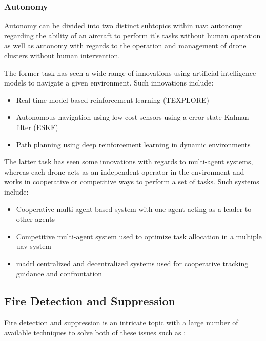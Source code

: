 \documentclass[runningheads]{llncs}
\begin{document}
\subsubsection{Autonomy}

Autonomy can be divided into two distinct subtopics within \acrshort{uav}: autonomy regarding the ability of an aircraft to perform it's tasks without human operation as well as autonomy with regards to the operation and management of drone clusters without human intervention.

The former task has seen a wide range of innovations using artificial intelligence models to navigate a given environment. Such innovations include:

\begin{itemize}
	\item Real-time model-based reinforcement learning (TEXPLORE) \cite{7838739}
	\item Autonomous navigation using low cost sensors using a error-state Kalman filter (ESKF) \cite{Youn2021}
	\item Path planning using deep reinforcement learning in dynamic environments \cite{ZHANG2022108194}
\end{itemize}

The latter task has seen some innovations with regards to multi-agent systems, whereas each drone acts as an independent operator in the environment and works in cooperative or competitive ways to perform a set of tasks. Such systems include:

\begin{itemize}
	\item Cooperative multi-agent based system with one agent acting as a leader to other agents \cite{10.1007/978-3-030-49778-1_28}
	\item Competitive multi-agent system used to optimize task allocation in a multiple \acrshort{uav} system \cite{inproceedings4}
	\item \acrfull{madrl} centralized and decentralized systems used for cooperative tracking guidance and confrontation \cite{ZHOU2022100} \cite{article23}
\end{itemize}

\subsection{Fire Detection and Suppression}

Fire detection and suppression is an intricate topic with a large number of available techniques to solve both of these issues such as \cite{do8}:
\end{document}
